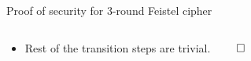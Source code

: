 \documentclass[aspectratio=169, lualatex, handout]{beamer}
\begin{document}
\begin{frame}{Proof of security for 3-round Feistel cipher}
	\begin{columns}[c]
		\begin{column}{0.5\textwidth}
			\begin{itemize}
				\item Rest of the transition steps are trivial. $\qed$
			\end{itemize}
		\end{column}
		\begin{column}{0.5\textwidth}
			\begin{center}
			\end{center}
		\end{column}
	\end{columns}
\end{frame}
\end{document}
